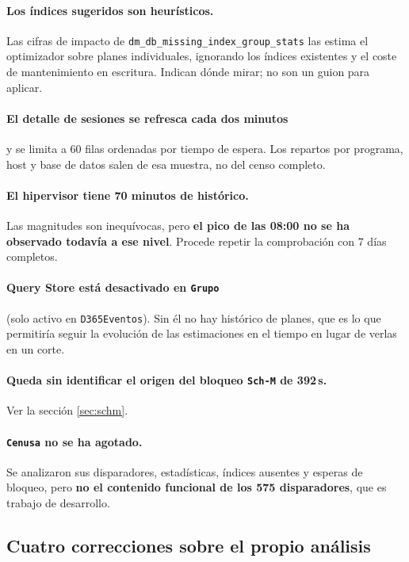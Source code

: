 \documentclass[11pt,a4paper]{article}
\newcommand{\cod}[1]{\texttt{\small #1}}
\begin{document}
\paragraph{Los índices sugeridos son heurísticos.} Las cifras de impacto de
\cod{dm\_db\_missing\_index\_group\_stats} las estima el optimizador sobre
planes individuales, ignorando los índices existentes y el coste de
mantenimiento en escritura. Indican dónde mirar; no son un guion para
aplicar.

\paragraph{El detalle de sesiones se refresca cada dos minutos} y se limita a
60 filas ordenadas por tiempo de espera. Los repartos por programa, host y
base de datos salen de esa muestra, no del censo completo.

\paragraph{El hipervisor tiene 70 minutos de histórico.} Las magnitudes son
inequívocas, pero \textbf{el pico de las 08:00 no se ha observado todavía a
ese nivel}. Procede repetir la comprobación con 7 días completos.

\paragraph{Query Store está desactivado en \cod{Grupo}} (solo activo en
\cod{D365Eventos}). Sin él no hay histórico de planes, que es lo que
permitiría seguir la evolución de las estimaciones en el tiempo en lugar de
verlas en un corte.

\paragraph{Queda sin identificar el origen del bloqueo \cod{Sch-M} de
392\,s.} Ver la sección \ref{sec:schm}.

\paragraph{\cod{Cenusa} no se ha agotado.} Se analizaron sus disparadores,
estadísticas, índices ausentes y esperas de bloqueo, pero \textbf{no el
contenido funcional de los 575 disparadores}, que es trabajo de desarrollo.

\subsection{Cuatro correcciones sobre el propio análisis}
\label{sec:correcciones}
\end{document}
